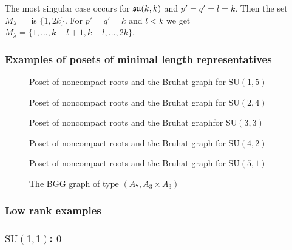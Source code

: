 The most singular case occurs for $\mathfrak{su}(k,k)$ and $p'=q'=l = k $. Then the set $M_\lambda =$ is $\{1,2k\}$. For $p'=q'=k$ and $l<k$ we get $M_\lambda = \{ 1,\ldots,k-l+1,k+l,\ldots, 2k \}$.

\subsubsection*{Examples of posets of minimal length representatives}

\begin{figure}[H]
  \centering 
   
	 
  \caption{Poset of noncompact roots and the Bruhat graph for $\mathrm{SU}(1,5)$}
\end{figure} 

\begin{figure}[H]
  \centering 
   
	 
  \caption{Poset of noncompact roots and the Bruhat graph for $\mathrm{SU}(2,4)$}
\end{figure} 

\begin{figure}[H]
  \centering 
	\resizebox{\textwidth}{!}{
   
	 
	}
  \caption{Poset of noncompact roots and the Bruhat graphfor $\mathrm{SU}(3,3)$}
\end{figure} 

\begin{figure}[H]
  \centering 
   
	 
  \caption{Poset of noncompact roots and the Bruhat graph for $\mathrm{SU}(4,2)$}
\end{figure} 

\begin{figure}[H]
  \centering 
  
	
  \caption{Poset of noncompact roots and the Bruhat graph for $\mathrm{SU}(5,1)$}
\end{figure} 

\begin{figure}[H]
  \centering 
  
  \caption{The BGG graph of type $(A_7,A_3\times A_3)$}
\end{figure} 

\subsubsection*{Low rank examples}
\subsubsection{$\mathrm{SU}(1, 1)$: $ 0 $}


